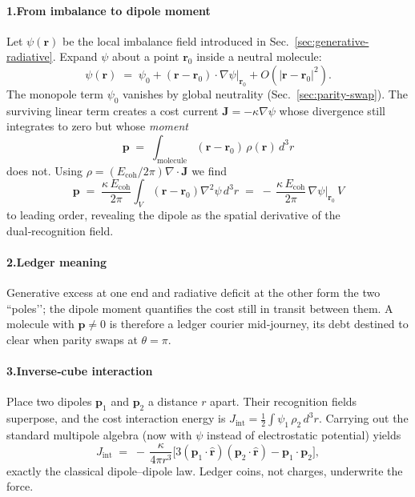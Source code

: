 \documentclass[11pt,oneside]{book}
\newcommand{\Eoh}{\ensuremath{E_{\text{coh}}}}       %
\begin{document}
\paragraph*{1.\;From imbalance to dipole moment}

Let $\psi(\mathbf r)$ be the local imbalance field introduced in
Sec.~\ref{sec:generative-radiative}.  
Expand $\psi$ about a point $\mathbf r_{0}$ inside a neutral molecule:
\[
  \psi(\mathbf r) \;=\; 
  \psi_{0} + (\mathbf r-\mathbf r_{0})\!\cdot\!\nabla\psi\bigl|_{\mathbf r_{0}} 
  + O(|\mathbf r-\mathbf r_{0}|^{2}).
\]
The monopole term $\psi_{0}$ vanishes by global neutrality
(Sec.~\ref{sec:parity-swap}).  
The surviving linear term creates a cost current
\(
  \mathbf J = -\kappa\nabla\psi
\)
whose divergence still integrates to zero but whose \emph{moment}
\[
  \mathbf p
  \;=\;
  \int_{\text{molecule}}
      (\mathbf r-\mathbf r_{0})\,\rho(\mathbf r)\,d^{3}r
\]
does not.  
Using $\rho=(\Eoh/2\pi)\nabla\cdot\mathbf J$ we find
\[
  \boxed{\;
  \mathbf p
  \;=\;
  \frac{\kappa\,\Eoh}{2\pi}
  \int_{V}
      (\mathbf r-\mathbf r_{0})
      \nabla^{2}\psi\,d^{3}r
  \;=\;
  -\,\frac{\kappa\,\Eoh}{2\pi}\,
  \nabla\psi\bigl|_{\mathbf r_{0}}\,V
  \;}
\]
to leading order, revealing the dipole as the spatial derivative of the
dual‑recognition field.

\paragraph*{2.\;Ledger meaning}

Generative excess at one end and radiative deficit at the other form the
two “poles’’; the dipole moment quantifies the cost still in transit
between them.  
A molecule with $\mathbf p\neq0$ is therefore a ledger courier mid‑journey,
its debt destined to clear when parity swaps at $\theta=\pi$.

\paragraph*{3.\;Inverse‑cube interaction}

Place two dipoles $\mathbf p_{1}$ and $\mathbf p_{2}$ a distance $r$
apart.  
Their recognition fields superpose, and the cost interaction energy is
\(
  J_{\text{int}} = \tfrac12\int\psi_{1}\,\rho_{2}\,d^{3}r.
\)
Carrying out the standard multipole algebra (now with $\psi$ instead of
electrostatic potential) yields
\[
  J_{\text{int}}
  \;=\;
  -\,\frac{\kappa}{4\pi r^{3}}
  \bigl[
    3(\mathbf p_{1}\!\cdot\!\hat{\mathbf r})
      (\mathbf p_{2}\!\cdot\!\hat{\mathbf r})
    - \mathbf p_{1}\!\cdot\!\mathbf p_{2}
  \bigr],
\]
exactly the classical dipole–dipole law.  
Ledger coins, not charges, underwrite the force.
\end{document}
